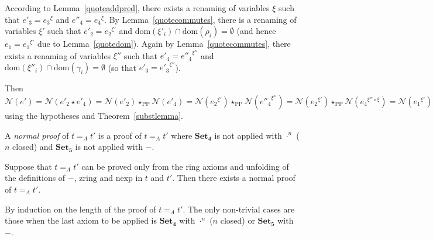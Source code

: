 \documentclass[numreferences]{kluwer}
\newcommand{\N}{\ensuremath{\mathcal{N}}}
\newcommand{\zring}{\ensuremath{\mathrm{zring}}}
\newcommand{\nexp}{\ensuremath{\mathrm{nexp}}}
\newcommand{\axiom}[1]{\ensuremath{\mathbf{#1}}}
\newcommand{\domain}{\ensuremath{\mathrm{dom}}}
\newcommand{\renamevar}[2]{\ensuremath{{#1}^{#2}}}
\newcommand{\isrenamevar}[3]{\ensuremath{{#1}=\renamevar{#2}{#3}}}
\newcommand{\starPP}{\ensuremath{\star_{\mathrm{PP}}}}
\begin{document}
\begin{article}
\begin{pf}
According to Lemma~\ref{quoteaddpred}, there exists a renaming of variables
$\xi$ such that {\isrenamevar{e'_3}{e_3}\xi} and
{\isrenamevar{e''_4}{e_4}\xi}.  By Lemma~\ref{quotecommutes}, there
is a renaming of variables $\xi'$ such that {\isrenamevar{e'_2}{e_2}{\xi'}}
and $\domain(\xi'_i)\cap\domain(\rho_i)=\emptyset$ (and hence
{\isrenamevar{e_1}{e_1}{\xi'}} due to Lemma~\ref{quotedom}).
Again by Lemma~\ref{quotecommutes}, there exists a renaming of
variables $\xi''$ such that {\isrenamevar{e'_4}{e''_4}{\xi''}}
and $\domain(\xi''_i)\cap\domain(\gamma_i)=\emptyset$ (so that
{\isrenamevar{e'_3}{e'_3}{\xi''}}). %

Then
$\N(e')%
=\N(e'_2\star e'_4)%
=\N(e'_2)\starPP\N(e'_4)%
=\N(\renamevar{e_2}{\xi'})\starPP\N(\renamevar{e''_4}{\xi''})%
=\N(\renamevar{e_2}{\xi'})\starPP\N(\renamevar{e_4}{\xi''\circ\xi})%
=\N(\renamevar{e_1}{\xi'})\starPP\N(\renamevar{e_3}{\xi''\circ\xi})%
=\N(e_1)\starPP\N(\renamevar{e'_3}{\xi''})=\N(e_1)\starPP\N(e'_3)%
=\N(e_1\star e'_3)%
=\N(e)$
using the hypotheses and Theorem~\ref{substlemma}.
\end{pf}

\begin{definition}\label{defn:normalproof} A \emph{normal proof} of $t=_A t'$
is a proof of $t=_A t'$ where \axiom{Set_4} is not applied with
$\cdot^n$ ($n$ closed) and \axiom{Set_5} is not applied with $-$.
\end{definition}

\begin{lemma}\label{normalproof} Suppose that $t=_A t'$ can be proved
only from the ring axioms and unfolding of the definitions of $-$,
$\zring$ and $\nexp$ in $t$ and $t'$.  Then there exists a normal proof
of $t=_A t'$.
\end{lemma}
\begin{pf}
By induction on the length of the proof of $t=_A t'$.  The only non-trivial
cases are those when the last axiom to be applied is \axiom{Set_4} with
$\cdot^n$ ($n$ closed) or \axiom{Set_5} with $-$.


\end{pf}
\end{article}
\end{document}
